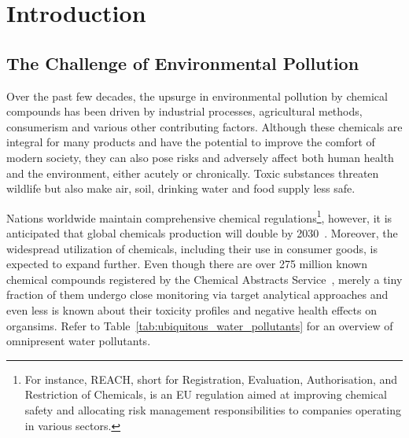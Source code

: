 \chapter{Introduction}\label{chap:introduction}

\section{The Challenge of Environmental Pollution}

Over the past few decades, the upsurge in environmental pollution by chemical compounds has been driven by industrial processes, agricultural methods, consumerism and various other contributing factors. Although these chemicals are integral for many products and have the potential to improve the comfort of modern society, they can also pose risks and adversely affect both human health and the environment, either acutely or chronically. Toxic substances threaten wildlife but also make air, soil, drinking water and food supply less safe. 

Nations worldwide maintain comprehensive chemical regulations\footnote{For instance, REACH, short for Registration, Evaluation, Authorisation, and Restriction of Chemicals, is an EU regulation aimed at improving chemical safety and allocating risk management responsibilities to companies operating in various sectors.}, however, it is anticipated that global chemicals production will double by 2030~\cite{chemicaloutlook}. Moreover, the widespread utilization of chemicals, including their use in consumer goods, is expected to expand further.
Even though there are over 275 million known chemical compounds registered by the Chemical Abstracts Service~\cite{CAS}, merely a tiny fraction of them undergo close monitoring via target analytical approaches and even less is known about their toxicity profiles and negative health effects on organsims. Refer to Table~\ref{tab:ubiquitous_water_pollutants} for an overview of omnipresent water pollutants.


